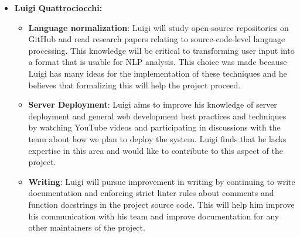 \documentclass[12pt]{article}
\begin{document}
\begin{enumerate}
\begin{itemize}
        \item \textbf{Luigi Quattrociocchi:}
        \begin{itemize}
            \item \textbf{Language normalization}: Luigi will study open-source repositories on GitHub and read research papers relating to source-code-level language processing. This knowledge will be critical to transforming user input into a format that is usable for NLP analysis. This choice was made because Luigi has many ideas for the implementation of these techniques and he believes that formalizing this will help the project proceed.
            \item \textbf{Server Deployment}: Luigi aims to improve his knowledge of server deployment and general web development best practices and techniques by watching YouTube videos and participating in discussions with the team about how we plan to deploy the system. Luigi finds that he lacks expertise in this area and would like to contribute to this aspect of the project.
            \item \textbf{Writing}: Luigi will pursue improvement in writing by continuing to write documentation and enforcing strict linter rules about comments and function docstrings in the project source code. This will help him improve his communication with his team and improve documentation for any other maintainers of the project.
        \end{itemize}
    \end{itemize}
\end{enumerate}
\end{document}
